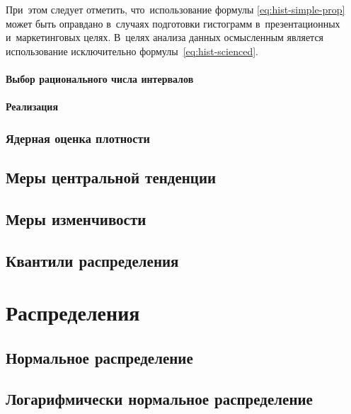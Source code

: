 \documentclass[]{scrartcl}
\begin{document}
При~этом следует отметить, что~использование формулы \ref{eq:hist-simple-prop} может быть оправдано в~случаях подготовки гистограмм в~презентационных и~маркетинговых целях. В~целях анализа данных осмысленным является использование исключительно формулы~\ref{eq:hist-scienced}.











\paragraph{Выбор рационального числа интервалов}\label{hist-number-of-k}
\par
\paragraph{Реализация}
\par

\subsubsection{Ядерная оценка плотности}
\subsection{Меры центральной тенденции}

\subsection{Меры изменчивости}

\subsection{Квантили распределения}

\section{Распределения}

\subsection{Нормальное распределение}

\subsection{Логарифмически нормальное распределение}
\end{document}
